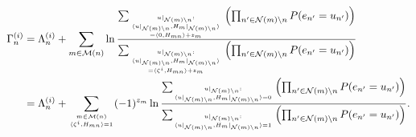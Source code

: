 \documentclass{ieeeaccess}
\newcommand{\sM}{{\cal M}}
\newcommand{\sN}{{\cal N}}
\theoremstyle{definition}		%
\newcommand{\mmark}[1]{{\color{magenta} #1}}
\begin{document}
\begin{figure*}%
\normalsize			%
\setcounter{MYtempeqncnt}{13}%
\setcounter{equation}{17}%
	~\\[-30pt]	%
	\begin{align}
	\Gamma_n^{(i)} &=\Lambda_n^{(i)} + \sum_{m\in\sM(n)}\ln \frac{
	\sum_{u|_{\sN(m)\setminus n}: \atop { \langle u|_{\sN(m)\setminus n}, H_m|_{\sN(m)\setminus n} \rangle \atop = \langle 0, H_{mn} \rangle +z_m } } \left(\prod_{n'\in\sN(m)\setminus n} P(e_{n'}=u_{n'})\right) }{ 
	\sum_{u|_{\sN(m)\setminus n}: \atop { \langle u|_{\sN(m)\setminus n}, H_m|_{\sN(m)\setminus n} \rangle \atop = \langle \zeta^i, H_{mn} \rangle +z_m } } \left(\prod_{n'\in\sN(m)\setminus n} P(e_{n'}=u_{n'})\right) }  \label{eq:v_last0}\\
	&= \Lambda_n^{(i)} + \sum_{m\in\sM(n) \atop  \langle \zeta^i, H_{mn} \rangle=1  } (-1)^{z_m} \ln \frac{
	\sum_{u|_{\sN(m)\setminus n}: \atop { \langle u|_{\sN(m)\setminus n}, H_m|_{\sN(m)\setminus n} \rangle = 0 } } \left(\prod_{n'\in\sN(m)\setminus n} P(e_{n'}=u_{n'})\right) }{
	\sum_{u|_{\sN(m)\setminus n}: \atop { \langle u|_{\sN(m)\setminus n}, H_m|_{\sN(m)\setminus n} \rangle = 1 } } \left(\prod_{n'\in\sN(m)\setminus n} P(e_{n'}=u_{n'})\right) }. \label{eq:v_last}
	\end{align}
\setcounter{equation}{\value{MYtempeqncnt}}	%
\hrulefill									%
\end{figure*}
\end{document}
